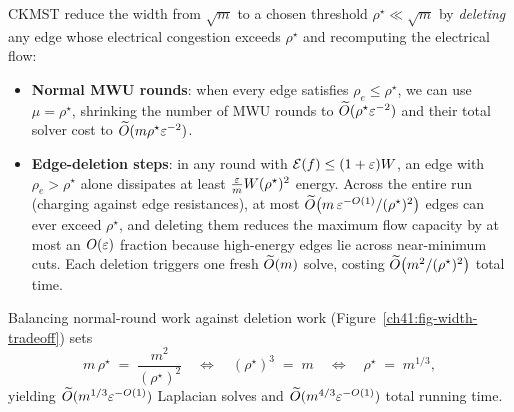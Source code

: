 CKMST reduce the width from $\sqrt{m}$ to a chosen threshold $\rho^\star \ll \sqrt{m}$ by \emph{deleting} any edge whose electrical congestion exceeds $\rho^\star$ and recomputing the electrical flow:
\begin{itemize}
  \item \textbf{Normal MWU rounds}: when every edge satisfies $\rho_e \le \rho^\star$, we can use $\mu = \rho^\star$, shrinking the number of MWU rounds to $\widetilde{O}(\rho^\star \varepsilon^{-2})$ and their total solver cost to $\widetilde{O}(m \rho^\star \varepsilon^{-2})$.
  \item \textbf{Edge-deletion steps}: in any round with $\mathcal{E}(f) \le (1+\varepsilon)W$, an edge with $\rho_e > \rho^\star$ alone dissipates at least $\frac{\varepsilon}{m}W (\rho^\star)^2$ energy. Across the entire run (charging against edge resistances), at most $\widetilde{O}\bigl(m\,\varepsilon^{-O(1)} / (\rho^\star)^2\bigr)$ edges can ever exceed $\rho^\star$, and deleting them reduces the maximum flow capacity by at most an $O(\varepsilon)$ fraction because high-energy edges lie across near-minimum cuts. Each deletion triggers one fresh $\widetilde{O}(m)$ solve, costing $\widetilde{O}\bigl(m^2 / (\rho^\star)^2\bigr)$ total time.
\end{itemize}
Balancing normal-round work against deletion work (Figure~\ref{ch41:fig-width-tradeoff}) sets
\[
  m\,\rho^\star \;=\; \frac{m^2}{(\rho^\star)^2}
  \quad\Longleftrightarrow\quad
  (\rho^\star)^3 \;=\; m
  \quad\Longleftrightarrow\quad
  \rho^\star \;=\; m^{1/3},
\]
yielding $\widetilde{O}(m^{1/3}\varepsilon^{-O(1)})$ Laplacian solves and $\widetilde{O}(m^{4/3}\varepsilon^{-O(1)})$ total running time.


